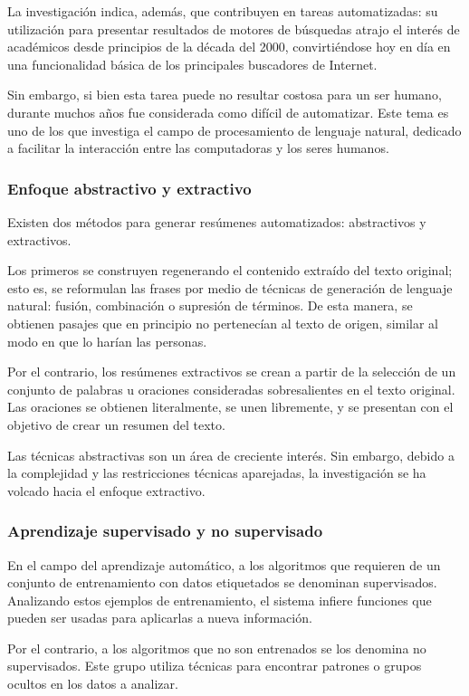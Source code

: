\documentclass[a4paper]{article}
\begin{document}
La investigación indica, además, que contribuyen en tareas automatizadas: su utilización para presentar resultados de motores de búsquedas atrajo el interés de académicos desde principios de la década del 2000, convirtiéndose hoy en día en una funcionalidad básica de los principales buscadores de Internet.

Sin embargo, si bien esta tarea puede no resultar costosa para un ser humano, durante muchos años fue considerada como difícil de automatizar. Este tema es uno de los que investiga el campo de procesamiento de lenguaje natural, dedicado a facilitar la interacción entre las computadoras y los seres humanos.


\subsubsection{Enfoque abstractivo y extractivo}

Existen dos métodos para generar resúmenes automatizados: abstractivos y extractivos.

Los primeros se construyen regenerando el contenido extraído del texto original; esto es, se reformulan las frases por medio de técnicas de generación de lenguaje natural: fusión, combinación o supresión de términos. De esta manera, se obtienen pasajes que en principio no pertenecían al texto de origen, similar al modo en que lo harían las personas. 

Por el contrario, los resúmenes extractivos se crean a partir de la selección de un conjunto de palabras u oraciones consideradas sobresalientes en el texto original. Las oraciones se obtienen literalmente, se unen libremente, y se presentan con el objetivo de crear un resumen del texto.

Las técnicas abstractivas son un área de creciente interés. Sin embargo, debido a la complejidad y las restricciones técnicas aparejadas, la investigación se ha volcado hacia el enfoque extractivo.


\subsubsection{Aprendizaje supervisado y no supervisado}
En el campo del aprendizaje automático, a los algoritmos que requieren de un conjunto de entrenamiento con datos etiquetados se denominan supervisados. Analizando estos ejemplos de entrenamiento, el sistema infiere funciones que pueden ser usadas para aplicarlas a nueva información.

Por el contrario, a los algoritmos que no son entrenados se los denomina no supervisados. Este grupo utiliza técnicas para encontrar patrones o grupos ocultos en los datos a analizar.
\end{document}
